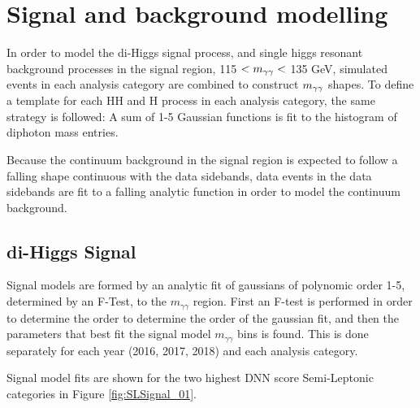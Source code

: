 \section{Signal and background modelling} \label{sec:AnalyticFitting}

In order to model the di-Higgs signal process, and single higgs resonant background processes in the signal region, 115 $< m_{\gamma\gamma} < $ 135 GeV, simulated events in each analysis category are combined to construct $m_{\gamma\gamma}$ shapes. To define a template for each HH and H process in each analysis category, the same strategy is followed: A sum of 1-5 Gaussian functions is fit to the histogram of diphoton mass entries. 

Because the continuum background in the signal region is expected to follow a falling shape continuous with the data sidebands, data events in the data sidebands are fit to a falling analytic function in order to model the continuum background. 

\subsection{di-Higgs Signal}
\label{sec:SignalFitting}

Signal models are formed by an analytic fit of gaussians of polynomic order 1-5, determined by an F-Test, to the $m_{\gamma\gamma}$ region.
First an F-test is performed in order to determine the order to determine the order of the gaussian fit, and then the parameters that best
fit the signal model $m_{\gamma\gamma}$ bins is found. This is done separately for each year (2016, 2017, 2018) and each analysis category.

Signal model fits are shown for the two highest DNN score Semi-Leptonic categories in Figure \ref{fig:SLSignal_01}.

